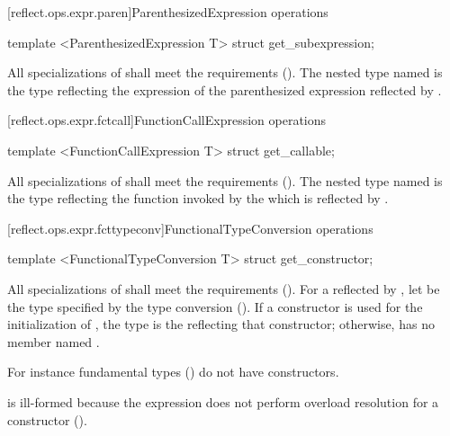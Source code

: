 [reflect.ops.expr.paren]{ParenthesizedExpression operations}
\begin{std.txt}\color{addclr}
\begin{itemdecl}
template <ParenthesizedExpression T> struct get_subexpression;
\end{itemdecl}
\begin{itemdescr}
\pnum
      All specializations of  shall meet the  requirements (). The nested type named  is the  type reflecting the expression  of the parenthesized expression  reflected by . 
\end{itemdescr}
\end{std.txt}

[reflect.ops.expr.fctcall]{FunctionCallExpression operations}
\begin{std.txt}\color{addclr}
\begin{itemdecl}
template <FunctionCallExpression T> struct get_callable;
\end{itemdecl}
\begin{itemdescr}
\pnum
      All specializations of  shall meet the  requirements (). The nested type named  is the  type reflecting the function invoked by the  which is reflected by .
\end{itemdescr}
\end{std.txt}


[reflect.ops.expr.fcttypeconv]{FunctionalTypeConversion operations}
\begin{std.txt}\color{addclr}
\begin{itemdecl}
template <FunctionalTypeConversion T> struct get_constructor;
\end{itemdecl}
\begin{itemdescr}
\pnum
			All specializations of  shall meet the  requirements (). For a  reflected by , let  be the type specified by the type conversion (). If a constructor is used for the initialization of , the type  is the  reflecting that constructor; otherwise,  has no member named .
      \begin{note} For instance fundamental types () do not have constructors. \end{note}
      \begin{note} 
      is ill-formed because the  expression does not perform overload resolution for a constructor ().
      \end{note}
\end{itemdescr}
\end{std.txt}

